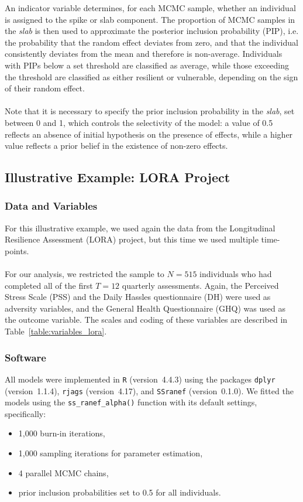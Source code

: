 \documentclass[12pt]{article}
\begin{document}
An indicator variable determines, for each MCMC sample, whether an individual is assigned to the spike or slab component. The proportion of MCMC samples in the \textit{slab} is then used to approximate the posterior inclusion probability (PIP), i.e. the probability that the random effect deviates from zero, and that the individual consistently deviates from the mean and therefore is non-average. Individuals with PIPs below a set threshold are classified as average, while those exceeding the threshold are classified as either resilient or vulnerable, depending on the sign of their random effect.\\
\\
Note that it is necessary to specify the prior inclusion probability in the \textit{slab}, set between 0 and 1, which controls the selectivity of the model: a value of 0.5 reflects an absence of initial hypothesis on the presence of effects, while a higher value reflects a prior belief in the existence of non-zero effects.

\subsection{Illustrative Example: LORA Project}
\subsubsection{Data and Variables}
For this illustrative example, we used again the data from the Longitudinal Resilience Assessment (LORA) project, but this time we used multiple time-points.\\
\\
For our analysis, we restricted the sample to \( N = 515 \) individuals who had completed all of the first \( T = 12 \) quarterly assessments. Again, the Perceived Stress Scale (PSS) and the Daily Hassles questionnaire (DH) were used as adversity variables, and the General Health Questionnaire (GHQ) was used as the outcome variable. The scales and coding of these variables are described in Table~\ref{table:variables_lora}.

\subsubsection{Software}
All models were implemented in \texttt{R} (version~4.4.3) using the packages \texttt{dplyr} (version~1.1.4), \texttt{rjags} (version~4.17), and \texttt{SSranef} (version~0.1.0). We fitted the models using the \texttt{ss\_ranef\_alpha()} function with its default settings, specifically:
\begin{itemize}
    \item 1,000 burn-in iterations,
    \item 1,000 sampling iterations for parameter estimation,
    \item 4 parallel MCMC chains,
    \item prior inclusion probabilities set to 0.5 for all individuals.
\end{itemize}
\end{document}
